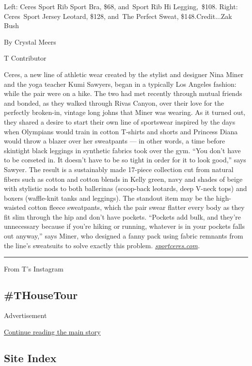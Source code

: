 Left: Ceres Sport Rib Sport Bra, \$68, and~Sport Rib Hi Legging,~\$108.
Right: Ceres~Sport Jersey Leotard, \$128, and~The Perfect Sweat,
\$148.Credit...Zak Bush

By Crystal Meers

T Contributor

Ceres, a new line of athletic wear created by the stylist and designer
Nina Miner and the yoga teacher Kumi Sawyers, began in a typically Los
Angeles fashion: while the pair were on a hike. The two had met recently
through mutual friends and bonded, as they walked through Rivas Canyon,
over their love for the perfectly broken-in, vintage long johns that
Miner was wearing. As it turned out, they shared a desire to start their
own line of sportswear inspired by the days when Olympians would train
in cotton T-shirts and shorts and Princess Diana would throw a blazer
over her sweatpants --- in other words, a time before skintight black
leggings in synthetic fabrics took over the gym. ``You don't have to be
corseted in. It doesn't have to be so tight in order for it to look
good,'' says Sawyer. The result is a sustainably made 17-piece
collection cut from natural fibers such as cotton and cotton blends in
Kelly green, navy and shades of beige with stylistic nods to both
ballerinas (scoop-back leotards, deep V-neck tops) and boxers
(waffle-knit tanks and leggings). The standout item may be the
high-waisted cotton fleece sweatpants, which the pair swear flatter
every body as they fit slim through the hip and don't have pockets.
``Pockets add bulk, and they're unnecessary because if you're hiking or
running, whatever is in your pockets falls out anyway,'' says Miner, who
designed a fanny pack using fabric remnants from the line's sweatsuits
to solve exactly this problem.
\href{https://www.sportceres.com/password}{\emph{sportceres.com}}\emph{.}

\begin{center}\rule{0.5\linewidth}{\linethickness}\end{center}

From T's Instagram

\hypertarget{thousetour}{%
\subsection{\#THouseTour}\label{thousetour}}

Advertisement

\protect\hyperlink{after-bottom}{Continue reading the main story}

\hypertarget{site-index}{%
\subsection{Site Index}\label{site-index}}

